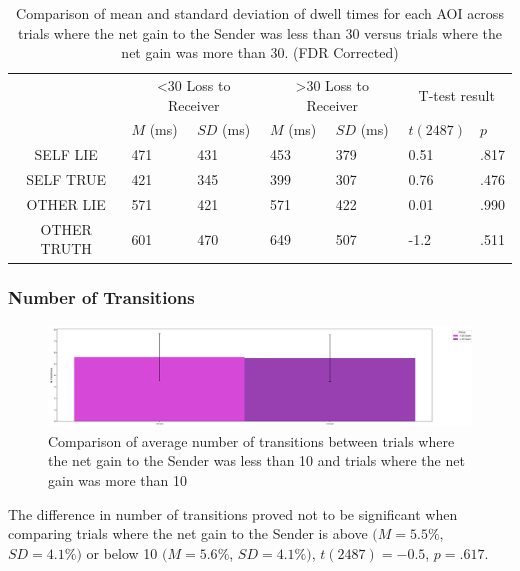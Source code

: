\documentclass[man, floatsintext]{apa7}
\begin{document}
\begin{table}[H]
	\centering
	\begin{tabular}{|c|p{1.5cm}|p{2cm}|p{1.5cm}|p{2cm}|p{2cm}|p{1.5cm}|}
		\hline
		\multirow{2}{*}{} & \multicolumn{2}{c|}{<30 Loss to Receiver} & \multicolumn{2}{c|}{>30 Loss to Receiver} & \multicolumn{2}{c|}{T-test result} \\ \cline{2-7}
		& $M$ (ms) &$SD$ (ms) & $M$ (ms) & $SD$ (ms) & $t(2487)$ & $p$ \\ \hline
		SELF LIE & 471 & 431 & 453 & 379 & 0.51 & .817  \\ \hline
		SELF TRUE & 421 & 345 & 399 & 307 & 0.76 & .476 \\ \hline
		OTHER LIE & 571 & 421 & 571 & 422 & 0.01 & .990 \\ \hline
		OTHER TRUTH & 601 & 470 & 649 & 507 & -1.2 & .511 \\ \hline
	\end{tabular}
	\vspace{0.3cm}
	\caption{Comparison of mean and standard deviation of dwell times for each AOI across trials where the net gain to the Sender was less than 30 versus trials where the net gain was more than 30. (FDR Corrected)}
	\label{tab:NetLossPerDwell30}
\end{table}

\subsubsection{Number of Transitions}

\begin{figure}[H]
	\includegraphics[width=\linewidth]{../plots/RESPONSE/NTransitionPerGain.png}
	\caption{Comparison of average number of transitions between trials where the net gain to the Sender was less than 10 and trials where the net gain was more than 10}
	\label{fig:NTransitionPerGain}
\end{figure}

The difference in number of transitions proved not to be significant when comparing trials where the net gain to the Sender is above $(M = 5.5\%$, $SD = 4.1\%)$ or below 10 $(M = 5.6\%$, $SD = 4.1\%)$, $t(2487)=-0.5$, $p=.617$.
\end{document}

